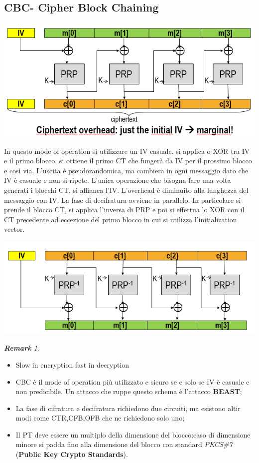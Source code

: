 \documentclass{book}
\theoremstyle{remark}
\newtheorem*{remark}{\textbf{Remark}}
\begin{document}
\subsection{CBC- Cipher Block Chaining}
\begin{center}
	\includegraphics[scale=0.5]{CBC.png}
\end{center}
In questo mode of operation si utilizzare un IV casuale, si applica o XOR tra IV e il primo blocco, si ottiene il primo CT che fungerà da IV per il prossimo blocco e così via\@. L'uscita è pseudorandomica, ma cambiera in ogni messaggio dato che IV è casuale e non si ripete\@. L'unica operazione che bisogna fare una volta generati i blocchi CT, si affianca l'IV\@.\newline
L'overhead è diminuito alla lunghezza del messaggio con IV\@.\newline
La fase di decifratura avviene in parallelo\@. In particolare si prende il blocco CT, si applica l'inversa di PRP e poi si effettua lo XOR con il CT precedente ad eccezione del primo blocco in cui si utilizza l'initialization vector\@.
\begin{center}
	\includegraphics[scale=0.5]{CBCDec.png}
\end{center}
\begin{remark}
	\begin{itemize}
		\item Slow in encryption fast in decryption
		\item CBC è il mode of operation più utilizzato e sicuro se e solo se IV è casuale e non predicibile\@. Un attacco che ruppe questo schema è l'attacco \textbf{BEAST};\@
		\item La fase di cifratura e decifratura richiedono due circuiti, ma esistono altir modi come CTR,CFB,OFB che ne richiedono solo uno;\@
		\item Il PT deve essere un multiplo della dimensione del blocco:\@in caso di dimensione minore si padda fino alla dimensione del blocco con standard \emph{PKCS\#7} (\textbf{Public Key Crypto Standards})\@.
	\end{itemize}
\end{remark}\newpage
\end{document}
